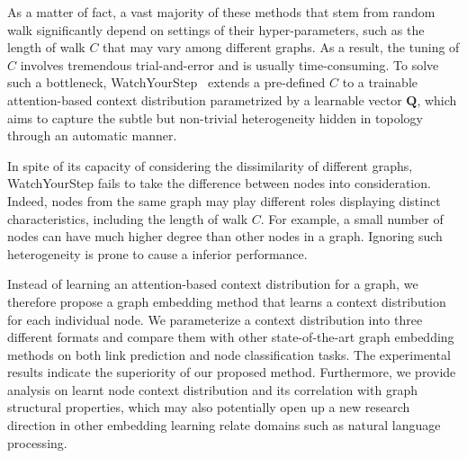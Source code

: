 \documentclass{article}
\begin{document}
As a matter of fact, a vast majority of these methods that stem from random walk significantly depend on settings of their hyper-parameters, such as the length of walk $C$ that may vary among different graphs. As a result, the tuning of $C$ involves tremendous trial-and-error and is usually time-consuming.
To solve such a bottleneck, WatchYourStep~\cite{abu2018watch} extends a pre-defined $C$ to a trainable attention-based context distribution parametrized by a learnable vector $\mathbf{Q}$, which aims to capture the subtle but non-trivial heterogeneity hidden in topology through an automatic manner. 

In spite of its capacity of considering the dissimilarity of different graphs, WatchYourStep fails to take the difference between nodes into consideration. Indeed, nodes from the same graph may play different roles displaying distinct characteristics, including the length of walk $C$. For example, a small number of nodes can have much higher degree than other nodes in a graph. Ignoring such heterogeneity is prone to cause a inferior performance.

Instead of learning an attention-based context distribution for a graph, we therefore propose a graph embedding method that learns a context distribution for each individual node. We parameterize a context distribution into three different formats and compare them with other state-of-the-art graph embedding methods on both link prediction and node classification tasks. The experimental results indicate the superiority of our proposed method. Furthermore, we provide analysis on learnt node context distribution and its correlation with graph structural properties, which may also potentially open up a new research direction in other embedding learning relate domains such as natural language processing. 



\end{document}
